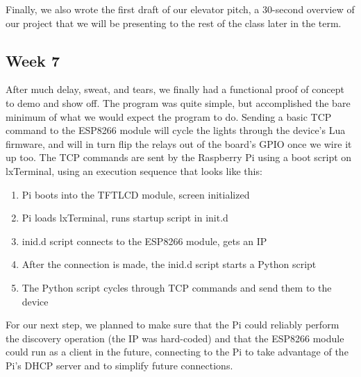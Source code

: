 \documentclass[letterpaper,10pt]{article}
\begin{document}
Finally, we also wrote the first draft of our elevator pitch, a 30-second
overview of our project that we will be presenting to the rest of the class
later in the term.

\subsection{Week 7}  

After much delay, sweat, and tears, we finally had a functional proof of
concept to demo and show off. The program was quite simple, but accomplished
the bare minimum of what we would expect the program to do.  Sending a basic
TCP command to the ESP8266 module will cycle the lights through the device's
Lua firmware, and will in turn flip the relays out of the board's GPIO once we
wire it up too. The TCP commands are sent by the Raspberry Pi using a boot
script on lxTerminal, using an execution sequence that looks like this:

\begin{enumerate}
    \item Pi boots into the TFTLCD module, screen initialized
    \item Pi loads lxTerminal, runs startup script in init.d
    \item inid.d script connects to the ESP8266 module, gets an IP
    \item After the connection is made, the inid.d script starts a Python
        script
    \item The Python script cycles through TCP commands and send them to the
        device
\end{enumerate}

For our next step, we planned to make sure that the Pi could reliably perform
the discovery operation (the IP was hard-coded) and that the ESP8266 module
could run as a client in the future, connecting to the Pi to take advantage of
the Pi's DHCP server and to simplify future connections.
\end{document}
